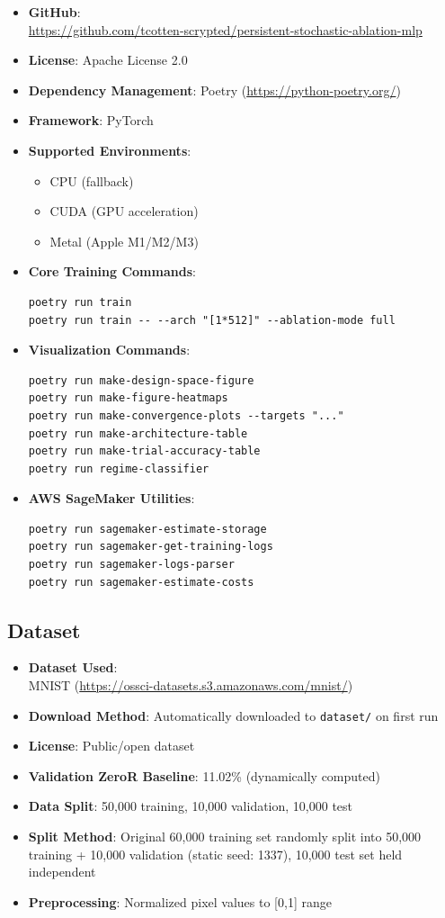 \documentclass[conference]{IEEEtran}
\begin{document}
\begin{itemize}
  \item \textbf{GitHub}:\\
  \url{https://github.com/tcotten-scrypted/persistent-stochastic-ablation-mlp}
  \item \textbf{License}: Apache License 2.0
  \item \textbf{Dependency Management}: Poetry (\url{https://python-poetry.org/})
  \item \textbf{Framework}: PyTorch
  \item \textbf{Supported Environments}:
    \begin{itemize}
      \item CPU (fallback)
      \item CUDA (GPU acceleration)
      \item Metal (Apple M1/M2/M3)
    \end{itemize}
  \item \textbf{Core Training Commands}:
\begin{verbatim}
poetry run train
poetry run train -- --arch "[1*512]" --ablation-mode full
\end{verbatim}
  \item \textbf{Visualization Commands}:
\begin{verbatim}
poetry run make-design-space-figure
poetry run make-figure-heatmaps
poetry run make-convergence-plots --targets "..."
poetry run make-architecture-table
poetry run make-trial-accuracy-table
poetry run regime-classifier
\end{verbatim}
  \item \textbf{AWS SageMaker Utilities}:
\begin{verbatim}
poetry run sagemaker-estimate-storage
poetry run sagemaker-get-training-logs
poetry run sagemaker-logs-parser
poetry run sagemaker-estimate-costs
\end{verbatim}
\end{itemize}

\subsection*{Dataset}

\begin{itemize}
  \item \textbf{Dataset Used}:\\
  MNIST (\url{https://ossci-datasets.s3.amazonaws.com/mnist/})
  \item \textbf{Download Method}: Automatically downloaded to \texttt{dataset/} on first run
  \item \textbf{License}: Public/open dataset
  \item \textbf{Validation ZeroR Baseline}: 11.02\% (dynamically computed)
  \item \textbf{Data Split}: 50,000 training, 10,000 validation, 10,000 test
  \item \textbf{Split Method}: Original 60,000 training set randomly split into 50,000 training + 10,000 validation (static seed: 1337), 10,000 test set held independent
  \item \textbf{Preprocessing}: Normalized pixel values to [0,1] range
\end{itemize}
\end{document}
